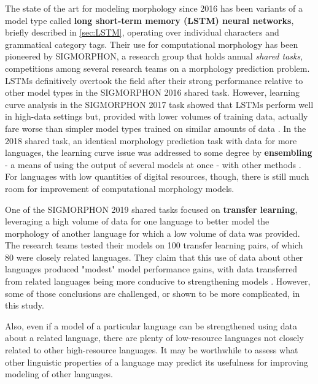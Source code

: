 The state of the art for modeling morphology since 2016 has been variants of a model type called \textbf{long short-term memory (LSTM) neural networks}, briefly described in \ref{sec:LSTM}, operating over individual characters and grammatical category tags. Their use for computational morphology has been pioneered by SIGMORPHON, a research group that holds annual \textit{shared tasks}, competitions among several research teams on a morphology prediction problem. LSTMs definitively overtook the field after their strong performance relative to other model types in the SIGMORPHON 2016 shared task. However, learning curve analysis in the SIGMORPHON 2017 task showed that LSTMs perform well in high-data settings but, provided with lower volumes of training data, actually fare worse than simpler model types trained on similar amounts of data \parencite{Cotterell2017a}. In the 2018 shared task, an identical morphology prediction task with data for more languages, the learning curve issue was addressed to some degree by \textbf{ensembling} - a means of using the output of several models at once - with other methods \parencite{Cotterell2018b}. For languages with low quantities of digital resources, though, there is still much room for improvement of computational morphology models.

One of the SIGMORPHON 2019 shared tasks focused on \textbf{transfer learning}, leveraging a high volume of data for one language to better model the morphology of another language for which a low volume of data was provided. The research teams tested their models on 100 transfer learning pairs, of which 80 were closely related languages. They claim that this use of data about other languages produced "modest" model performance gains, with data transferred from related languages being more conducive to strengthening models \parencite{McCarthy2019}. However, some of those conclusions are challenged, or shown to be more complicated, in this study. 

Also, even if a model of a particular language can be strengthened using data about a related language, there are plenty of low-resource languages not closely related to other high-resource languages. It may be worthwhile to assess what other linguistic properties of a language may predict its usefulness for improving modeling of other languages. 

